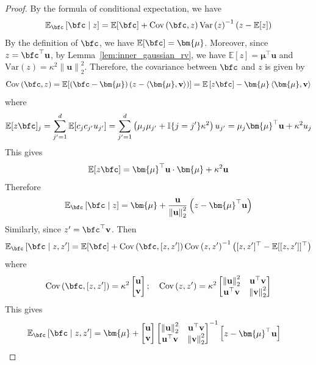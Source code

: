 \documentclass[10pt]{article} %
\theoremstyle{definition}
\theoremstyle{plain}
\newcommand{\paren}[1]{\left(#1\right)}
\newcommand{\norm}[1]{\left\|#1\right\|}
\newcommand{\inner}[2]{\left\langle#1, #2\right\rangle}
\providecommand{\E}{\mathbb{E}}
\def\bfu{{\mathbf{u}}}\def\bfv{{\mathbf{v}}}\def\bfw{{\mathbf{w}}}\def\bfx{{\mathbf{x}}}
\begin{document}
\begin{proof}
    By the formula of conditional expectation, we have
    \[
        \E_{\bfc}\left[\bfc\mid z\right] = \E[\bfc] + \text{Cov}\paren{\bfc,z}\text{Var}\paren{z}^{-1}\paren{z - \E[z]}
    \]
    By the definition of $\bfc$, we have $\E[\bfc] = \bm{\mu}$. Moreover, since $z = \bfc^\top\bfu$, by Lemma~\ref{lem:inner_gaussian_rv}, we have $\E[z] = \bm{\mu}^\top\bfu$ and $\text{Var}\paren{z} = \kappa^2\norm{\bfu}_2^2$. Therefore, the covariance between $\bfc$ and $z$ is given by
    \[
        \text{Cov}\paren{\bfc,z} = \E[\paren{\bfc - \bm{\mu}}\paren{z - \inner{\bm{\mu}}{\bfv}}] = \E\left[z\bfc\right] - \bm{\mu}\inner{\bm{\mu}}{\bfv}
    \]
    where
    \[
        \E[z\bfc]_j = \sum_{j'=1}^d\E[c_{j}c_{j'}u_{j'}] = \sum_{j'=1}^d\paren{\mu_j\mu_{j'} + \mathbb{I}\{j = j'\}\kappa^2}u_{j'} = \mu_j\bm{\mu}^\top\bfu + \kappa^2u_j
    \]
    This gives
    \[
        \E[z\bfc] = \bm{\mu}^\top\bfu\cdot \bm{\mu} + \kappa^2\bfu
    \]
    Therefore
    \[
       \E_{\bfc}\left[\bfc\mid z\right] = \bm{\mu} + \frac{\bfu}{\norm{\bfu}_2^2}\paren{z - \bm{\mu}^\top\bfu}
    \]
    Similarly, since $z' = \bfc^\top\bfv$. Then
    \[
        \E_{\bfc}\left[\bfc\mid z,z'\right] = \E[\bfc] + \text{Cov}\paren{\bfc,[z, z']}\text{Cov}\paren{z, z'}^{-1}\paren{[z, z']^\top - \E[[z, z']]^\top}
    \]
    where
    \[
        \text{Cov}\paren{\bfc,[z, z']} = \kappa^2\begin{bmatrix}
            \bfu\\
            \bfv
        \end{bmatrix}; \quad \text{Cov}\paren{z, z'} = \kappa^2\begin{bmatrix}
            \norm{\bfu}_2^2 & \bfu^\top\bfv\\
            \bfu^\top\bfv& \norm{\bfv}_2^2 
        \end{bmatrix}
    \]
    This gives
    \begin{align*}
        \E_{\bfc}\left[\bfc\mid z,z'\right] & = \bm{\mu} + \begin{bmatrix}
            \bfu\\
            \bfv
        \end{bmatrix}\begin{bmatrix}
            \norm{\bfu}_2^2 & \bfu^\top\bfv\\
            \bfu^\top\bfv& \norm{\bfv}_2^2 
        \end{bmatrix}^{-1}\begin{bmatrix}
            z - \bm{\mu}^\top\bfu\\

\end{bmatrix}
\end{align*}
\end{proof}
\end{document}
